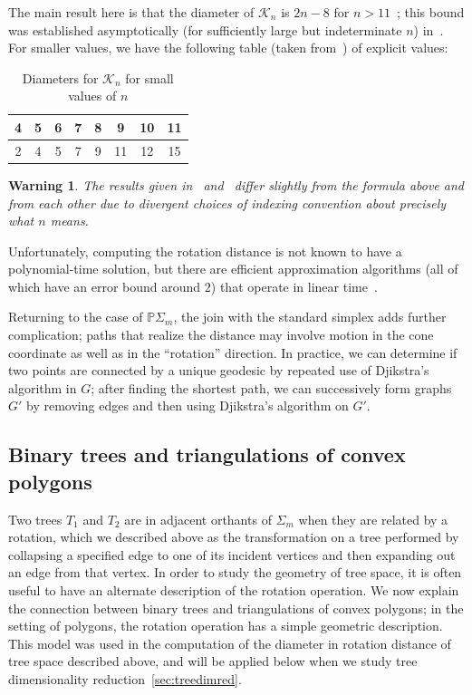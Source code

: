 \documentclass[a4paper,11pt]{article}
\newtheorem{warning}[theorem]{Warning}
\newcommand{\aK}{\mathcal{K}}
\begin{document}
The main result here is that the diameter of $\aK_n$ is $2n - 8$ for $n > 11$~\cite{pournin2014diameter}; this bound was established asymptotically (for sufficiently large but indeterminate $n$) in~\cite{sleator1988rotation}.
For smaller values, we have the following table (taken from~\cite[\S2.3]{sleator1988rotation}) of explicit values:

\begin{table}[ht]
    \caption{Diameters for $\aK_n$ for small values of $n$}
    \centering
    \begin{tabular}{c c c c c c c c}
    \hline\hline
    4 & 5 & 6 & 7 & 8 & 9 & 10 & 11 \\
    \hline
    2 & 4 & 5 & 7 & 9 & 11 & 12 & 15 \\
    \hline
    \end{tabular}
\end{table}

\begin{warning}
The results given in~\cite{pournin2014diameter} and~\cite{sleator1988rotation} differ slightly from the formula above and from each other due to divergent choices of indexing convention about precisely what $n$ means.
\end{warning}

Unfortunately, computing the rotation distance is not known to have a polynomial-time solution, but there are efficient approximation algorithms (all of which have an error bound around $2$) that operate in linear time~\cite{cleary2010linear}.

Returning to the case of $\mathbb{P}\Sigma_m$, the join with the standard simplex adds further complication; paths that realize the distance may involve motion in the cone coordinate as well as in the ``rotation'' direction.
In practice, we can determine if two points are connected by a unique geodesic by repeated use of Djikstra's algorithm in $G$; after finding the shortest path, we can successively form graphs $G'$ by removing edges and then using Djikstra's algorithm on $G'$.

\subsection{Binary trees and triangulations of convex polygons}

Two trees $T_1$ and $T_2$ are in adjacent orthants of $\Sigma_m$ when they are related by a rotation, which we described above as the transformation on a tree performed by collapsing a specified edge to one of its incident vertices and then expanding out an edge from that vertex.
In order to study the geometry of tree space, it is often useful to have an alternate description of the rotation operation.
We now explain the connection between binary trees and triangulations of convex polygons; in the setting of polygons, the rotation operation has a simple geometric description.
This model was used in the computation of the diameter in rotation distance of tree space described above, and will be applied below when we study tree dimensionality reduction~\ref{sec:treedimred}.
\end{document}
